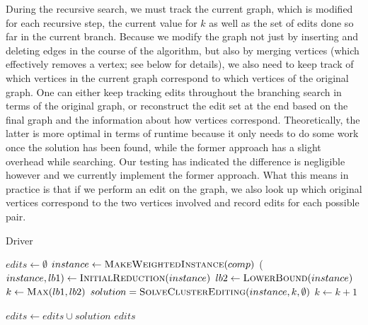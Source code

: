 \documentclass[12pt,oneside,english,parskip=full,headings=small]{scrbook}
\theoremstyle{definition}
\begin{document}
During the recursive search, we must track the current graph, which is modified for each recursive
step, the current value for $k$ as well as the set of edits done so far in the current branch.
Because we modify the graph not just by inserting and deleting edges in the course of the algorithm,
but also by merging vertices (which effectively removes a vertex; see below for details), we also
need to keep track of which vertices in the current graph correspond to which vertices of the
original graph. One can either keep tracking edits throughout the branching search in terms of the
original graph, or reconstruct the edit set at the end based on the final graph and the information
about how vertices correspond. Theoretically, the latter is more optimal in terms of runtime because
it only needs to do some work once the solution has been found, while the former approach has a
slight overhead while searching. Our testing has indicated the difference is negligible however and
we currently implement the former approach. What this means in practice is that if we perform an
edit on the graph, we also look up which original vertices correspond to the two vertices involved
and record edits for each possible pair.

\begin{algorithm}[h]
\caption{Driver}
\label{alg:driver}
\begin{algorithmic}

	\State $edits \gets \emptyset$
		\State $instance \gets \Call{MakeWeightedInstance}{comp}$
		\State ($instance, lb1) \gets \Call{InitialReduction}{instance}$
		\State $lb2 \gets \Call{LowerBound}{instance}$
		\State $k \gets \Call{Max}{lb1, lb2}$
		\Repeat
			\State $solution = \Call{SolveClusterEditing}{instance, k, \emptyset}$
			\State $k \gets k + 1$

		\State $edits \gets edits \cup solution$
	\EndFor
	\State \Return $edits$
\EndFunction

\end{algorithmic}
\end{algorithm}
\end{document}
